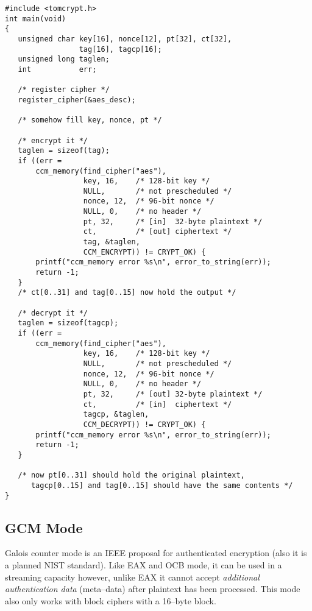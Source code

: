 \documentclass[synpaper]{book}
\begin{document}
\begin{small}
\begin{verbatim}
#include <tomcrypt.h>
int main(void)
{
   unsigned char key[16], nonce[12], pt[32], ct[32], 
                 tag[16], tagcp[16];
   unsigned long taglen;
   int           err;

   /* register cipher */
   register_cipher(&aes_desc);

   /* somehow fill key, nonce, pt */
 
   /* encrypt it */
   taglen = sizeof(tag);
   if ((err = 
       ccm_memory(find_cipher("aes"),
                  key, 16,    /* 128-bit key */
                  NULL,       /* not prescheduled */
                  nonce, 12,  /* 96-bit nonce */
                  NULL, 0,    /* no header */
                  pt, 32,     /* [in]  32-byte plaintext */
                  ct,         /* [out] ciphertext */
                  tag, &taglen,
                  CCM_ENCRYPT)) != CRYPT_OK) {
       printf("ccm_memory error %s\n", error_to_string(err));
       return -1;
   }
   /* ct[0..31] and tag[0..15] now hold the output */

   /* decrypt it */
   taglen = sizeof(tagcp);
   if ((err = 
       ccm_memory(find_cipher("aes"),
                  key, 16,    /* 128-bit key */
                  NULL,       /* not prescheduled */
                  nonce, 12,  /* 96-bit nonce */
                  NULL, 0,    /* no header */
                  pt, 32,     /* [out] 32-byte plaintext */
                  ct,         /* [in]  ciphertext */
                  tagcp, &taglen,
                  CCM_DECRYPT)) != CRYPT_OK) {
       printf("ccm_memory error %s\n", error_to_string(err));
       return -1;
   }

   /* now pt[0..31] should hold the original plaintext,
      tagcp[0..15] and tag[0..15] should have the same contents */
}
\end{verbatim}
\end{small}

\subsection{GCM Mode}
Galois counter mode is an IEEE proposal for authenticated encryption (also it is a planned NIST standard).  Like EAX and OCB mode, it can be used in a streaming capacity 
however, unlike EAX it cannot accept \textit{additional authentication data} (meta--data) after plaintext has been processed.  This mode also only works with 
block ciphers with a 16--byte block.
\end{document}
